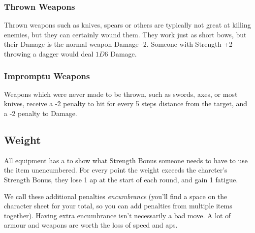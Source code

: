 \begin{multicols}{2}
\subsubsection{Thrown Weapons}

Thrown weapons such as knives, spears or others are typically not great at killing enemies, but they can certainly wound them.
They work just as short bows, but their Damage is the normal weapon Damage -2.
Someone with Strength +2 throwing a dagger would deal $1D6$ Damage.

\subsubsection{Impromptu Weapons}

Weapons which were never made to be thrown, such as swords, axes, or most knives, receive a -2 penalty to hit for every 5 steps distance from the target, and a -2 penalty to Damage.

\subsection{Weight}

All equipment has a  to show what Strength Bonus someone needs to have to use the item unencumbered.
For every point the \gls{weight} exceeds the charcter's Strength Bonus, they lose 1 \gls{ap} at the start of each round, and gain 1 \gls{fatigue}.

We call these additional penalties \textit{encumbrance} (you'll find a space on the character sheet for your total, so you can add penalties from multiple items together).
Having extra encumbrance isn't necessarily a bad move.
A lot of armour and weapons are worth the loss of speed and \glspl{ap}.

\end{multicols}

\section{}\label{fate_points}

